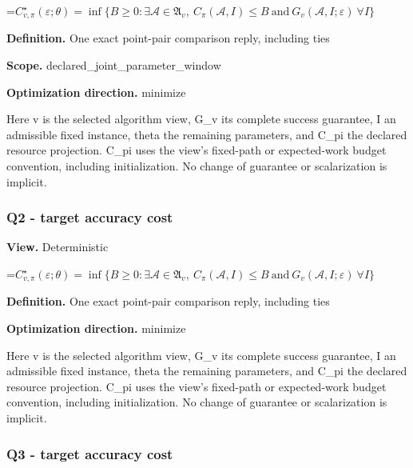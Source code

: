 \documentclass[10pt,a4paper]{article}
\newcommand{\AtlasMath}[1]{\par\begingroup\centering\setbox0=\hbox{$\displaystyle #1$}\ifdim\wd0>1.4\linewidth\typeout{ATLAS WIDE FORMULA: \the\wd0}\fi\ifdim\wd0>\linewidth\resizebox{\linewidth}{!}{\box0}\else\box0\fi\par\endgroup}
\begin{document}
\AtlasMath{C^\star_{v,\pi}(\varepsilon;\theta)=\inf\{B\ge0:\exists\mathcal A\in\mathfrak A_v,\ C_\pi(\mathcal A,I)\le B\ \text{and}\ G_v(\mathcal A,I;\varepsilon)\ \forall I\}}


\textbf{Definition.} One exact point-pair comparison reply, including ties



\textbf{Scope.} declared\_joint\_parameter\_window



\textbf{Optimization direction.} minimize



Here v is the selected algorithm view, G\_v its complete success guarantee, I an admissible fixed instance, theta the remaining parameters, and C\_pi the declared resource projection. C\_pi uses the view's fixed-path or expected-work budget convention, including initialization. No change of guarantee or scalarization is implicit.



\subsubsection{Q2 - target accuracy cost}


\textbf{View.} Deterministic



\AtlasMath{C^\star_{v,\pi}(\varepsilon;\theta)=\inf\{B\ge0:\exists\mathcal A\in\mathfrak A_v,\ C_\pi(\mathcal A,I)\le B\ \text{and}\ G_v(\mathcal A,I;\varepsilon)\ \forall I\}}


\textbf{Definition.} One exact point-pair comparison reply, including ties



\textbf{Optimization direction.} minimize



Here v is the selected algorithm view, G\_v its complete success guarantee, I an admissible fixed instance, theta the remaining parameters, and C\_pi the declared resource projection. C\_pi uses the view's fixed-path or expected-work budget convention, including initialization. No change of guarantee or scalarization is implicit.



\subsubsection{Q3 - target accuracy cost}
\end{document}
